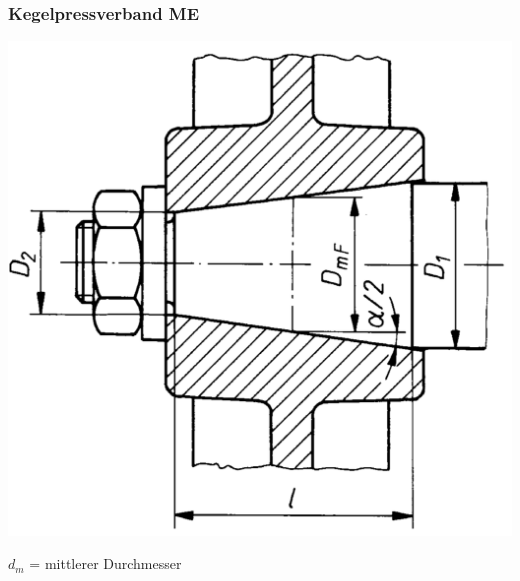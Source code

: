 \subsubsection{Kegelpressverband \hfill ME}
\begin{footnotesize}
    \begin{minipage}{0.3\linewidth}
        \begin{center}
            \includegraphics[width = 1.0\linewidth]{src/images/MAEIP_Kegelpressverband}
        \end{center}
    \end{minipage}
    \begin{minipage}{0.58\linewidth}
        \begin{center}
            \scriptsize{$d_m$ = mittlerer Durchmesser} 
            \vspace{-1mm}
        \end{center}
    \end{minipage}
\end{footnotesize}